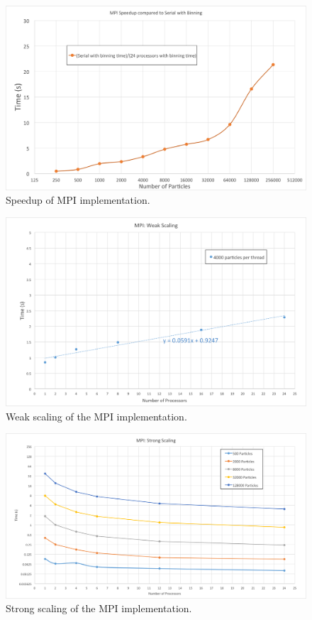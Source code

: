 \documentclass[12pt]{article}
\begin{document}
\begin{figure}
  \includegraphics[width=\textwidth]{graphs/MPI_speedup.png}
  \caption{Speedup of MPI implementation.}
  \label{fig:mpi-speedup}
\end{figure}

\begin{figure}
\includegraphics[width=\textwidth]{graphs/MPI_weak_scaling.png}
  \caption{Weak scaling of the MPI implementation.}
  \label{fig:mpi-weak}
\end{figure}

\begin{figure}
\includegraphics[width=\textwidth]{graphs/MPI_strong_scaling.png}
  \caption{Strong scaling of the MPI implementation.}
  \label{fig:mpi-strong}
\end{figure}
\end{document}
